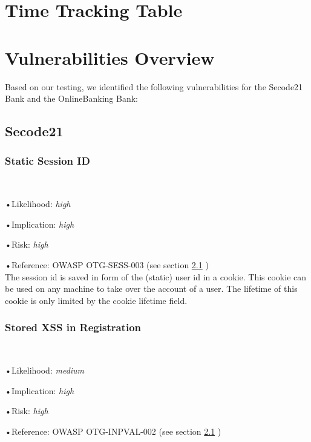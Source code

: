 \documentclass[headsepline,footsepline,footinclude=false,oneside,fontsize=11pt,paper=a4,listof=totoc,bibliography=totoc]{scrbook} %
\begin{document}

 
\frontmatter{}

%
%
%
%
\tableofcontents{}

\mainmatter{}

\chapter{Time Tracking Table}
%
\chapter{Vulnerabilities Overview}
Based on our testing, we identified the following vulnerabilities for the Secode21
Bank and the OnlineBanking Bank:
\section{Secode21}
\subsection{Static Session ID}\label{Static Session ID}\

•Likelihood: \textit{high}\

•Implication: \textit{high}\

•Risk: \textit{high}\

•Reference: OWASP OTG-SESS-003 (see section \ref{} )\\

The session id is saved in form of the (static) user id in a cookie. This cookie can be used on any machine
to take over the account of a user. The lifetime of this cookie is only limited by the cookie lifetime field.


\subsection{Stored XSS in Registration}\label{Stored XSS in Registration}\

•Likelihood: \textit{medium}\

•Implication: \textit{high}\

•Risk: \textit{high}\

•Reference: OWASP OTG-INPVAL-002 (see section \ref{} )\\
\end{document}

